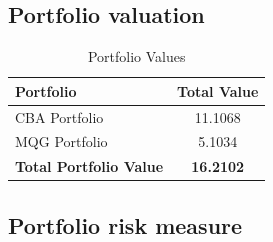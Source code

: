 \subsection{Portfolio valuation}
\begin{table}[H]
    \centering
    \begin{tabular}{@{} l c @{}}
        \toprule
        \textbf{Portfolio} & \textbf{Total Value} \\
        \midrule
        CBA Portfolio & 11.1068 \\
        MQG Portfolio & 5.1034 \\
        \midrule
        \textbf{Total Portfolio Value} & \textbf{16.2102} \\
        \bottomrule
    \end{tabular}
    \caption{Portfolio Values}
    \label{tab:portfolio_values}
\end{table}
\subsection{Portfolio risk measure}

